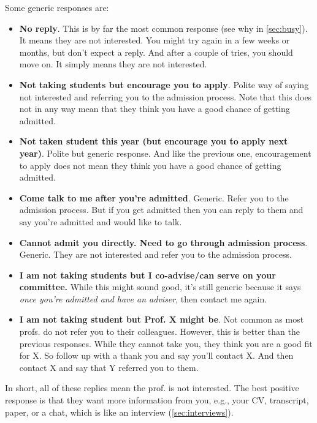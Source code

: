 \documentclass[oneside,11pt]{book}
\begin{document}
Some generic responses are:
\begin{itemize}
\item \textbf{No reply}. This is by far the most common response (see why in \autoref{sec:busy}).  It means they are not interested.
You might try again in a few weeks or months, but don't expect a reply. And after a couple of tries, you should move on.  It simply means they are not interested.
\item \textbf{Not taking students but encourage you to apply}. Polite way of saying not interested and referring you to the admission process. Note that this does not in any way mean that they think you have a good chance of getting admitted.

\item \textbf{Not taken student this year (but encourage you to apply next year)}. Polite but generic response.  And like the previous one, encouragement to apply does not mean they think you have a good chance of getting admitted.

\item \textbf{Come talk to me after you're admitted}. Generic. Refer you to the admission process. But if you get admitted then you can reply to them and say you're admitted and would like to talk.

\item \textbf{Cannot admit you directly. Need to go through admission process}. Generic. They are not interested and refer you to the admission process.

\item \textbf{I am not taking students but I co-advise/can serve on your committee.} While this might sound good, it's still generic because it says \emph{once you're admitted and have an adviser}, then contact me again. 

\item \textbf{I am not taking student but Prof. X might be}. Not common as most profs. do not refer you to their colleagues. However, this is better than the previous responses. While they cannot take you, they think you are a good fit for X. So follow up with a thank you and say you'll contact X.  And then contact X and say that Y referred you to them.
\end{itemize}

In short, all of these replies mean the prof. is not interested.  The best positive response is that they want more information from you, e.g., your CV, transcript, paper, or a chat, which is like an interview (\autoref{sec:interviews}). 
\end{document}
